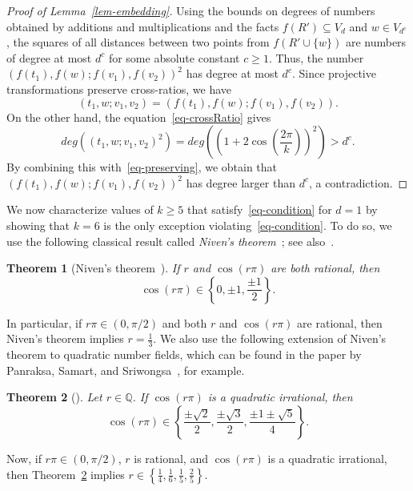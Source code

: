 \documentclass{article}
\newtheorem{theorem}{Theorem}
\begin{document}
\begin{proof}[Proof of Lemma~\ref{lem-embedding}]
Using the bounds on degrees of numbers obtained by additions and multiplications and the facts $f(R') \subseteq V_d$ and $w \in V_{d^c}$, the squares of all distances between two points from $f(R' \cup \{w\})$ are numbers of degree at most $d^c$ for some absolute constant $c \geq 1$.
Thus, the number $(f(t_1),f(w);f(v_1),f(v_2))^2$ has degree at most $d^c$.
Since projective transformations preserve cross-ratios, we have
\begin{equation}
\label{eq-preserving}
(t_1,w;v_1,v_2) = (f(t_1),f(w);f(v_1),f(v_2)).
\end{equation}
On the other hand, the equation~\eqref{eq-crossRatio} 
gives
\[
deg\left((t_1,w;v_1,v_2)^2\right) = deg\left(\left(1+2\cos\left(\frac{2\pi}{k}\right)\right)^2\right) > d^c.
\]
By combining this with~\eqref{eq-preserving}, we obtain that $(f(t_1),f(w);f(v_1),f(v_2))^2$ has degree larger than $d^c$, a contradiction.
\end{proof}

We now characterize values of $k \geq 5$ that satisfy~\eqref{eq-condition} for $d=1$ by showing that $k=6$ is the only exception violating~\eqref{eq-condition}.
To do so, we use the following classical result called \emph{Niven's theorem}~\cite{niven56}; see also~\cite{pss24}.

\begin{theorem}[Niven's theorem~\cite{niven56}]
\label{thm-niven}
If $r$ and $\cos(r\pi)$ are both rational, then \[\cos(r\pi)\in\left\{0,\pm 1,\frac{\pm 1}{2}\right\}.\]
\end{theorem}

In particular, if $r\pi \in (0,\pi/2)$ and both $r$ and $\cos(r\pi)$ are rational, then Niven's theorem implies $r =\frac{1}{3}$.
We also use the following extension of Niven’s theorem to quadratic number fields, which can be found in the paper by Panraksa, Samart, and Sriwongsa~\cite{pss24}, for example.

\begin{theorem}[\cite{pss24}]
\label{thm-nivenQuadratic}
Let  $r\in \mathbb{Q}$.
If  $\cos(r\pi)$ is a quadratic irrational, then \[\cos(r\pi) \in\left\{\frac{\pm \sqrt{2}}{2},\frac{\pm \sqrt{3}}{2},\frac{\pm 1 \pm \sqrt{5}}{4}\right\}.\]
\end{theorem}

Now, if $r\pi \in (0,\pi/2)$, $r$ is rational, and $\cos(r\pi)$ is a quadratic irrational, then Theorem~\ref{thm-nivenQuadratic} implies $r \in \left\{\frac{1}{4},\frac{1}{6},\frac{1}{5},\frac{2}{5}\right\}$.
\end{document}
